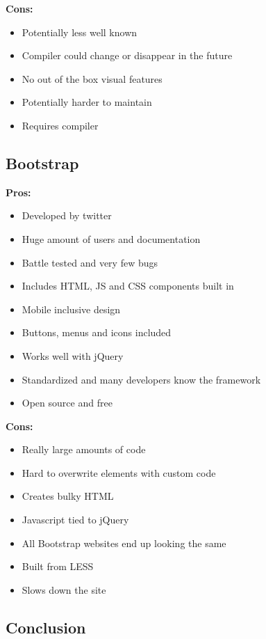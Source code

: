 \documentclass[draftclsnofoot,onecolumn,letterpaper,10pt,compsoc]{IEEEtran}
\begin{document}
    \textbf{Cons:}
    \begin{itemize}
      \item Potentially less well known
      \item Compiler could change or disappear in the future
      \item No out of the box visual features
      \item Potentially harder to maintain
      \item Requires compiler
    \end{itemize}

	\subsection{Bootstrap}

    \textbf{Pros:}
    \begin{itemize}
      \item Developed by twitter
      \item Huge amount of users and documentation
      \item Battle tested and very few bugs
      \item Includes HTML, JS and CSS components built in
      \item Mobile inclusive design
      \item Buttons, menus and icons included
      \item Works well with jQuery
      \item Standardized and many developers know the framework
      \item Open source and free
    \end{itemize}

    \textbf{Cons:}
    \begin{itemize}
      \item Really large amounts of code
      \item Hard to overwrite elements with custom code
      \item Creates bulky HTML
      \item Javascript tied to jQuery
      \item All Bootstrap websites end up looking the same
      \item Built from LESS
      \item Slows down the site
    \end{itemize}

  \subsection{Conclusion}
\end{document}
